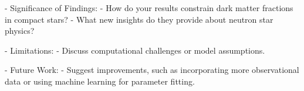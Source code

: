 - Significance of Findings:  
     - How do your results constrain dark matter fractions in compact stars?  
     - What new insights do they provide about neutron star physics?  

- Limitations:  
     - Discuss computational challenges or model assumptions.  

- Future Work:  
     - Suggest improvements, such as incorporating more observational data or using machine learning for parameter fitting.  
